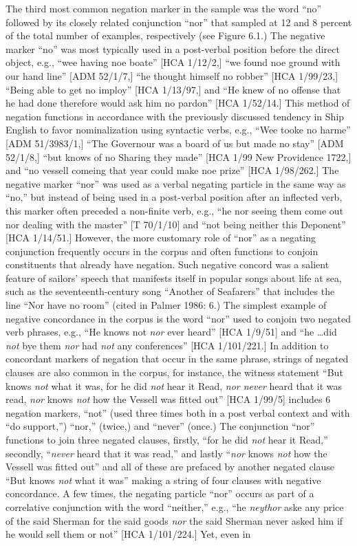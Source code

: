 \begin{styleStandard}
The third most common negation marker in the sample was the word “no” followed by its closely related conjunction “nor” that sampled at 12 and 8 percent of the total number of examples, respectively (see Figure 6.1.) The negative marker “no” was most typically used in a post-verbal position before the direct object, e.g., “wee having noe boate” [HCA 1/12/2,] “we found noe ground with our hand line” [ADM 52/1/7,] “he thought himself no robber” [HCA 1/99/23,] “Being able to get no imploy” [HCA 1/13/97,] and “He knew of no offense that he had done therefore would ask him no pardon” [HCA 1/52/14.] This method of negation functions in accordance with the previously discussed tendency in Ship English to favor nominalization using syntactic verbs, e.g., “Wee tooke no harme” [ADM 51/3983/1,] “The Governour was a board of us but made no stay” [ADM 52/1/8,] “but knows of no Sharing they made” [HCA 1/99 New Providence 1722,] and “no vessell comeing that year could make noe prize” [HCA 1/98/262.] The negative marker “nor” was used as a verbal negating particle in the same way as “no,” but instead of being used in a post-verbal position after an inflected verb, this marker often preceded a non-finite verb, e.g., “he nor seeing them come out nor dealing with the master” [T 70/1/10] and “not being neither this Deponent” [HCA 1/14/51.] However, the more customary role of “nor” as a negating conjunction frequently occurs in the corpus and often functions to conjoin constituents that already have negation. Such negative concord was a salient feature of sailors’ speech that manifests itself in popular songs about life at sea, such as the seventeenth-century song “Another of Seafarers” that includes the line “Nor have no room” (cited in Palmer 1986: 6.) The simplest example of negative concordance in the corpus is the word “nor” used to conjoin two negated verb phrases, e.g., “He knows\textit{ }not \textit{nor} ever heard” [HCA 1/9/51] and “he …did \textit{not} bye them \textit{nor} had\textit{ not} any conferences” [HCA 1/101/221.] In addition to concordant markers of negation that occur in the same phrase, strings of negated clauses are also common in the corpus, for instance, the witness statement “But knows\textit{ not} what it was, for he did\textit{ not} hear it Read, \textit{nor never} heard that it was read, \textit{nor} knows\textit{ not} how the Vessell was fitted out” [HCA 1/99/5] includes 6 negation markers, “not” (used three times both in a post verbal context and with “do support,”) “nor,” (twice,) and “never” (once.) The conjunction “nor” functions to join three negated clauses, firstly, “for he did\textit{ not} hear it Read,” secondly, “\textit{never} heard that it was read,” and lastly “\textit{nor} knows\textit{ not} how the Vessell was fitted out” and all of these are prefaced by another negated clause “But knows\textit{ not} what it was” making a string of four clauses with negative concordance. A few times, the negating particle “nor” occurs as part of a correlative conjunction with the word “neither,” e.g., “he \textit{neythor} aske any price of the said Sherman for the said goods \textit{nor }the said Sherman never asked him if he would sell them or not” [HCA 1/101/224.] Yet, even in 
\end{styleStandard}
